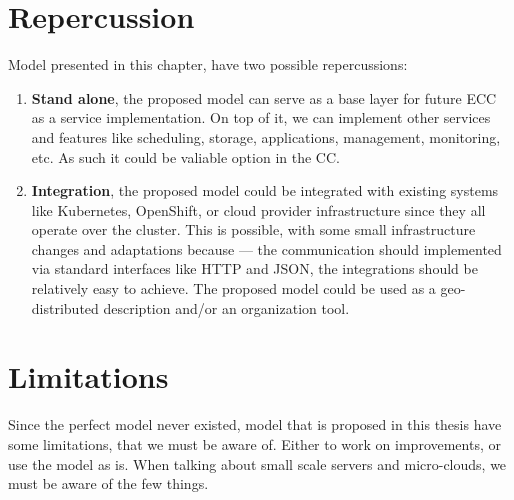 \section{Repercussion}\label{sec:repercussion}
%
Model presented in this chapter, have two possible repercussions:

\begin{enumerate}[start=1,label={(\bfseries \arabic*)}]
	\item \textbf{Stand alone}, the proposed model can serve as a base layer for future ECC as a service implementation. On top of it, we can implement other services and features like scheduling, storage, applications, management, monitoring, etc. As such it could be valiable option in the CC.
	\item \textbf{Integration}, the proposed model could be integrated with existing systems like Kubernetes, OpenShift, or cloud provider infrastructure since they all operate over the cluster. This is possible, with some small infrastructure changes and adaptations because --- the communication should implemented via standard interfaces like HTTP and JSON, the integrations should be relatively easy to achieve. The proposed model could be used as a geo-distributed description and/or an  organization tool.
\end{enumerate} 
%
%
\section{Limitations}\label{sec:limitations}
%
Since the perfect model never existed, model that is proposed in this thesis have some limitations, that we must be aware of. Either to work on improvements, or use the model as is. When talking about small scale servers and micro-clouds, we must be aware of the few things. 


